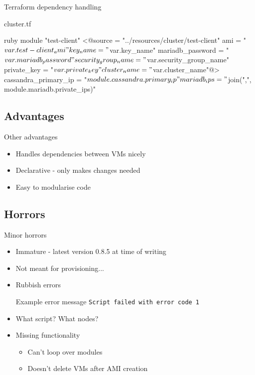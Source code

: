 \documentclass[xcolor=dvipsnames]{beamer}
\begin{document}
\begin{frame}[fragile]{Terraform dependency handling}
  \begin{block}{cluster.tf}
    \begin{code}{ruby}
module "test-client" {
  <@source               = "../resources/cluster/test-client"
  ami                  = "${var.test-client_ami}"
  key_name             = "${var.key_name}"
  mariadb_password     = "${var.mariadb_password}"
  security_group_name  = "${var.security_group_name}"
  private_key          = "${var.private_key}"
  cluster_name         = "${var.cluster_name}"@>
  cassandra_primary_ip = "${module.cassandra.primary_ip}"
  mariadb_ips          = "${join(",", module.mariadb.private_ips)}"
}
    \end{code}
  \end{block}
\end{frame}

\subsection{Advantages}
\begin{frame}{Other advantages}
  \begin{itemize}
    \item Handles dependencies between VMs nicely
    \item Declarative - only makes changes needed
    \item Easy to modularise code
  \end{itemize}
\end{frame}

\subsection{Horrors}
\begin{frame}{Minor horrors}
  \begin{itemize}
    \item Immature - latest version 0.8.5 at time of writing
    \item Not meant for provisioning...
    \item Rubbish errors
    \pause
    \begin{block}{Example error message}
      \texttt{Script failed with error code 1}
    \end{block}
    \item What script? What nodes?
    \item Missing functionality
    \begin{itemize}
      \item Can't loop over modules
      \item Doesn't delete VMs after AMI creation
    \end{itemize}
  \end{itemize}
\end{frame}
\end{document}
